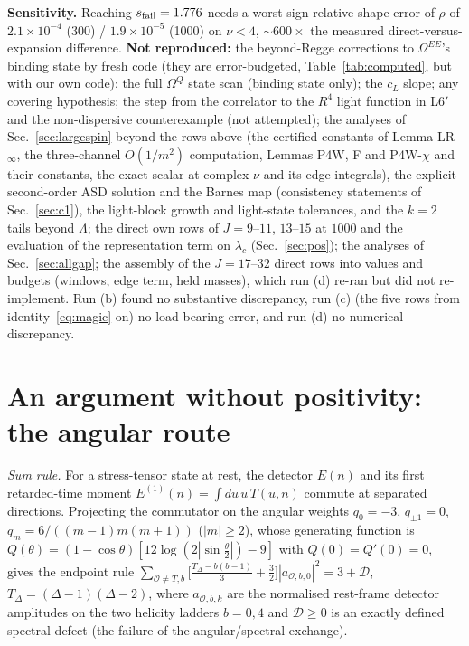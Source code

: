\documentclass[aps,prl,onecolumn,superscriptaddress,nofootinbib]{revtex4-2}
\begin{document}
\textbf{Sensitivity.} Reaching $s_{\rm fail}=1.776$ needs a worst-sign relative shape error of $\rho$
of $2.1\times10^{-4}$ (300) / $1.9\times10^{-5}$ (1000) on $\nu<4$, $\sim600\times$ the measured
direct-versus-expansion difference. \textbf{Not reproduced:} the beyond-Regge corrections to $\Omega^{EE}$'s
binding state by fresh code (they are error-budgeted, Table~\ref{tab:computed}, but with our own code); the full $\Omega^Q$ state scan (binding state only); the $c_L$ slope; any covering hypothesis; the step from the
correlator to the $R^4$ light function in L6$'$ and the non-dispersive counterexample (not attempted); the analyses of
Sec.~\ref{sec:largespin} beyond the rows above (the certified constants of Lemma LR$_\infty$, the three-channel $O(1/m^2)$
computation, Lemmas P4W, F and P4W-$\chi$ and their constants, the exact scalar at complex $\nu$ and its edge integrals), the
explicit second-order ASD solution and the Barnes map (consistency statements of Sec.~\ref{sec:c1}), the light-block growth and light-state tolerances, and the
$k=2$ tails beyond $\Lambda$; the direct own rows of $J=9$--$11$, $13$--$15$ at $1000$ and the evaluation of the representation term on $\lambda_c$ (Sec.~\ref{sec:pos}); the analyses of Sec.~\ref{sec:allgap}; the assembly of the $J=17$--$32$ direct rows into values and budgets (windows, edge term,
held masses), which run (d) re-ran but did not re-implement. Run (b) found no substantive discrepancy, run (c) (the five rows from
identity~\eqref{eq:magic} on) no load-bearing error, and run (d) no numerical discrepancy.



\section{An argument without positivity: the angular route}
\label{sec:angular}
\emph{Sum rule.} For a stress-tensor state at rest, the detector $E(n)$ and its first retarded-time moment
$E^{(1)}(n)=\int du\,u\,T(u,n)$ commute at separated directions. Projecting the commutator on the angular weights
$q_0=-3$, $q_{\pm1}=0$, $q_m=6/((m-1)m(m+1))$ ($|m|\ge2$), whose generating function is
$Q(\theta)=(1-\cos\theta)[12\log(2|\sin\frac\theta2|)-9]$ with $Q(0)=Q'(0)=0$, gives the endpoint rule
$\sum_{\mathcal O\ne T,b}\big[\frac{T_\Delta-b(b-1)}3+\frac32\big]|a_{\mathcal O,b,0}|^2=3+\mathcal D$, $T_\Delta=(\Delta-1)(\Delta-2)$,
where $a_{\mathcal O,b,k}$ are the normalised rest-frame detector amplitudes on the two helicity ladders $b=0,4$ and
$\mathcal D\ge0$ is an exactly defined spectral defect (the failure of the angular/spectral exchange).
\end{document}

